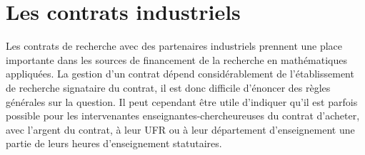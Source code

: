 \section{Les contrats industriels}
Les contrats de recherche avec des partenaires industriels prennent
une place importante dans les sources de financement de la recherche en
math\'ematiques appliqu\'ees. La gestion d'un contrat d\'epend
consid\'erablement de l'\'etablissement de recherche signataire du
contrat, il est donc difficile d'\'enoncer des r\`egles
g\'en\'erales sur la question. Il peut cependant \^etre utile d'indiquer
qu'il est parfois possible pour les intervenant\mp e\mp s
enseignant\mp e\mp s-chercheur\mp euse\mp s du contrat d'acheter, avec l'argent du
contrat, \`a leur UFR ou \`a leur d\'epartement d'enseignement une
partie de leurs heures d'enseignement statutaires.


